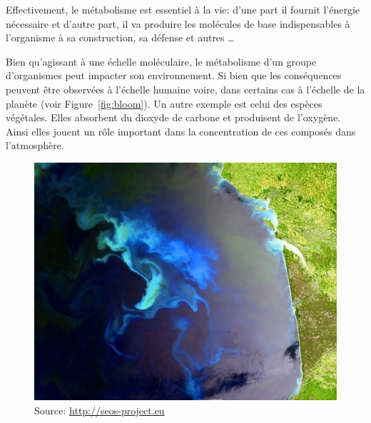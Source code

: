\begin{refsegment}
    Effectivement, le métabolisme est essentiel à la vie: d'une part il fournit l'énergie nécessaire et d'autre part, il va produire les molécules de base indispensables à l'organisme à sa construction, sa défense et autres \ldots
    
    Bien qu'agissant à une échelle moléculaire, le métabolisme d'un groupe d'organismes peut impacter son environnement. Si bien que les conséquences peuvent être observées à l'échelle humaine voire, dans certains cas à l'échelle de la planète (voir Figure~\cref{fig:bloom}). Un autre exemple est celui des espèces végétales. Elles absorbent du dioxyde de carbone et produisent de l'oxygène. Ainsi elles jouent un rôle important dans la concentration de ces composés dans l’atmosphère.
    
    
    \begin{shadedfigure}[H]
        \begin{subfigure}[b]{.5\textwidth}
            \centering
            \includegraphics[width=\textwidth]{img/bloom_gascogne.jpg}
            \caption{{\tiny Source: \url{http://seos-project.eu}}}
            \label{fig:bloom_gascogne}
        \end{subfigure}
        \hfill
        \begin{subfigure}[b]{.5\textwidth}
            \centering

\end{subfigure}
\end{shadedfigure}
\end{refsegment}
